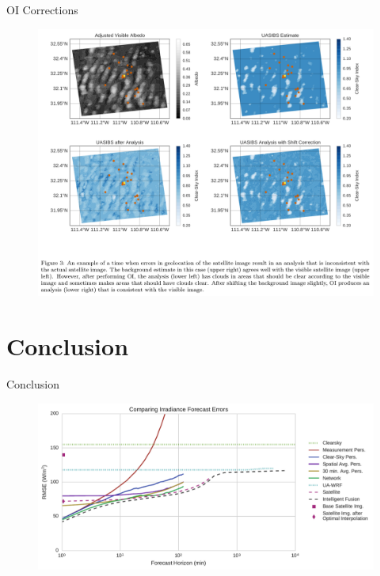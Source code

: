 \documentclass[aspectratio=169]{beamer}
\begin{document}
\begin{frame}{OI Corrections}
\begin{figure}[h]
  \includegraphics[height=.7\textheight]{figs/parallax.png}
\end{figure}
\end{frame}

\section{Conclusion}
\begin{frame}{Conclusion}
\begin{figure}[h]
  \includegraphics[width=.8\textwidth]{../dissertation/figs/timehorizon.pdf}
\end{figure}
\end{frame}
\end{document}
